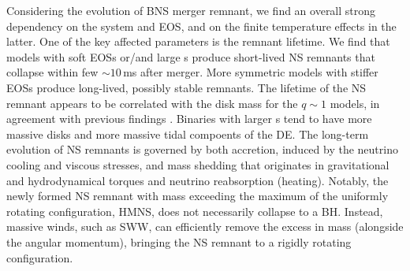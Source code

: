 
Considering the \pmerg{} evolution of \ac{BNS} merger remnant, we find an
overall strong dependency on the system \mr{} and \ac{EOS}, and on the 
finite temperature effects in the latter. One of the key affected 
parameters is the remnant lifetime. We find that models with 
soft \acp{EOS} or/and large \mr{}s produce short-lived \ac{NS} remnants that 
collapse within few ${\sim}10\,$ms after merger. 
%
More symmetric models with stiffer \acp{EOS} produce long-lived, possibly 
stable remnants. The lifetime of the \ac{NS} remnant appears to be correlated with the 
disk mass for the $q\sim 1$ models, in agreement with previous findings 
\citep{Radice:2017lry,Radice:2018pdn}.
Binaries with larger \mr{}s tend to have more massive disks and more massive tidal 
compoents of the \ac{DE}.
%
%
The long-term evolution of \pmerg{} \ac{NS} remnants is governed by both accretion, 
induced by the neutrino cooling and viscous stresses, and mass shedding that originates 
in gravitational and hydrodynamical torques and neutrino reabsorption (heating). 
Notably, the newly formed \ac{NS} remnant with mass exceeding the 
maximum of the uniformly rotating configuration, \ac{HMNS}, does not necessarily collapse 
to a \ac{BH}. Instead, massive winds, such as \ac{SWW}, can efficiently remove the 
excess in mass (alongside the angular momentum), bringing the \ac{NS} remnant 
to a rigidly rotating configuration.
%

